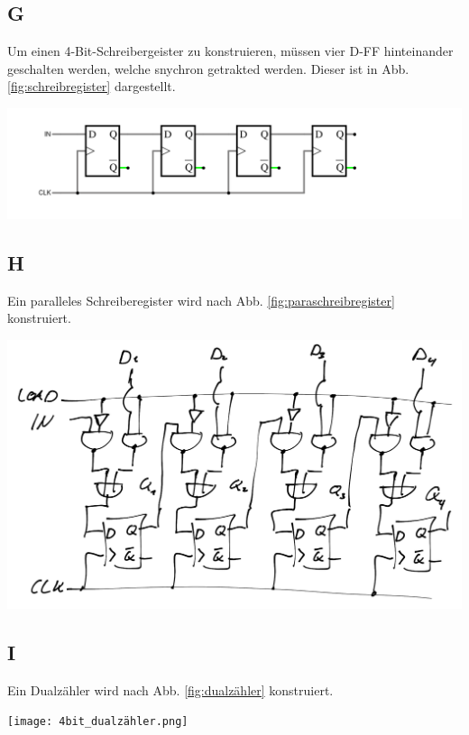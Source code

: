 \documentclass[10pt]{article}
\newenvironment{Figure}
  {\par\medskip\noindent\minipage{\linewidth}}
  {\endminipage\par\medskip}
\begin{document}
\begin{multicols}{2}
	\subsection*{G}
	Um einen 4-Bit-Schreibergeister zu konstruieren, müssen vier D-FF hinteinander geschalten werden, welche snychron getrakted werden. Dieser ist in Abb. \ref{fig:schreibregister} dargestellt.
	\begin{Figure}
		\centering
		\includegraphics[width=1\textwidth]{circuit-20240908-2016.png}
		\label{fig:schreibregister}
	\end{Figure}
	\subsection*{H}
	Ein paralleles Schreiberegister wird nach Abb. \ref{fig:paraschreibregister} konstruiert.
	\begin{Figure}
		\centering
		\includegraphics[width=1\textwidth]{parallel-schieberegister.png}
		\label{fig:paraschreibregister}
	\end{Figure}
	\subsection*{I}
	Ein Dualzähler wird nach Abb. \ref{fig:dualzähler} konstruiert.
	\begin{Figure}
		\centering
		\texttt{[image: 4bit\_dualzähler.png]}
		\label{fig:dualzähler}
	\end{Figure}

\end{multicols}
\end{document}
